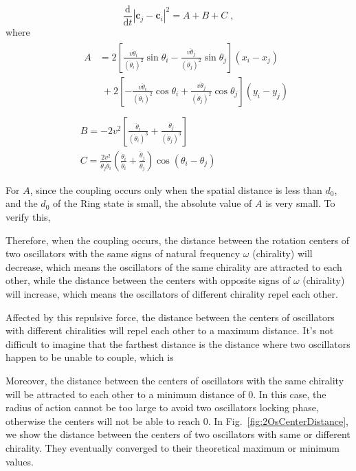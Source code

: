 \documentclass[%
 aip,
 amsmath,amssymb,
 reprint,%
]{revtex4-1}
\begin{document}
\begin{equation}
    \frac{\mathrm{d}}{\mathrm{d}t}\left| \mathbf{c}_j-\mathbf{c}_i \right|^2=A+B+C\;,
\end{equation}
where 
\begin{eqnarray}
    &&\begin{aligned}
        A&=2\left[ \frac{v\ddot{\theta}_i}{\left( \dot{\theta}_i \right) ^2}\sin \theta _i-\frac{v\ddot{\theta}_j}{\left( \dot{\theta}_j \right) ^2}\sin \theta _j \right] \left( x_i-x_j \right)\\
        &\;+2\left[ -\frac{v\ddot{\theta}_i}{\left( \dot{\theta}_i \right) ^2}\cos \theta _i+\frac{v\ddot{\theta}_j}{\left( \dot{\theta}_j \right) ^2}\cos \theta _j \right] \left( y_i-y_j \right)\\
    \end{aligned}\\
	&&B=-2v^2\left[ \frac{\ddot{\theta}_i}{\left( \dot{\theta}_i \right) ^3}+\frac{\ddot{\theta}_j}{\left( \dot{\theta}_j \right) ^3} \right]\\
	&&C=\frac{2v^2}{\dot{\theta}_j\dot{\theta}_i}\left( \frac{\ddot{\theta}_i}{\dot{\theta}_i}+\frac{\ddot{\theta}_j}{\dot{\theta}_j} \right) \cos \left( \theta _i-\theta _j \right)
\end{eqnarray}

For $A$, since the coupling occurs only when the spatial distance is less than $d_0$, and the $d_0$ of the Ring state is small, the absolute value of $A$ is very small. To verify this, 


Therefore, when the coupling occurs, the distance between the rotation centers of two oscillators with the same signs of natural frequency $\omega$ (chirality) will decrease, which means the oscillators of the same chirality are attracted to each other, while the distance between the centers with opposite signs of $\omega$ (chirality) will increase, which means the oscillators of different chirality repel each other.

Affected by this repulsive force, the distance between the centers of oscillators with different chiralities will repel each other to a maximum distance. It's not difficult to imagine that the farthest distance is the distance where two oscillators happen to be unable to couple, which is 

Moreover, the distance between the centers of oscillators with the same chirality will be attracted to each other to a minimum distance of $0$. In this case, the radius of action cannot be too large to avoid two oscillators locking phase, otherwise the centers will not be able to reach $0$.
In Fig.~\ref{fig:2OsCenterDistance}, we show the distance between the centers of two oscillators with same or different chirality. They eventually converged to their theoretical maximum or minimum values.
\end{document}
